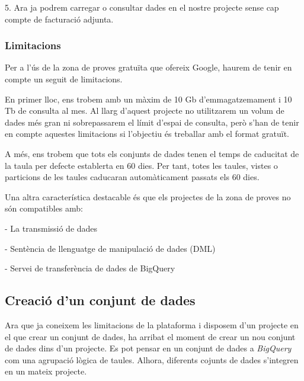 \documentclass[12pt,longbibliography]{article}
\theoremstyle{definition}
\theoremstyle{remark}
\begin{document}
\vspace{2mm}

5. Ara ja podrem carregar o consultar dades en el nostre projecte sense cap compte de facturació adjunta.

\subsubsection{Limitacions}

Per a l’ús de la zona de proves gratuïta que ofereix Google, haurem de tenir en compte un seguit de limitacions.

\vspace{2mm}

En primer lloc, ens trobem amb un màxim de 10 Gb d’emmagatzemament i 10 Tb de consulta al mes. Al llarg d’aquest projecte no utilitzarem un volum de dades més gran ni sobrepassarem el límit d’espai de consulta, però s’han de tenir en compte aquestes limitacions si l’objectiu és treballar amb el format gratuït.

\vspace{2mm}

A més, ens trobem que tots els conjunts de dades tenen el temps de caducitat de la taula per defecte establerta en 60 dies. Per tant, totes les taules, vistes o particions de les taules caducaran automàticament passats els 60 dies.

\vspace{2mm}

Una altra característica destacable és que els projectes de la zona de proves no són compatibles amb:

- La transmissió de dades

- Sentència de llenguatge de manipulació de dades (DML)

- Servei de transferència de dades de BigQuery

\subsection{Creació d'un conjunt de dades}

Ara que ja coneixem les limitacions de la plataforma i disposem d'un projecte en el que crear un conjunt de dades, ha arribat el moment de crear un nou conjunt de dades dins d'un projecte. Es pot pensar en un conjunt de dades a \textit{BigQuery} com una agrupació lògica de taules. Alhora, diferents cojunts de dades s'integren en un mateix projecte. 

\vspace{2mm}
\end{document}
